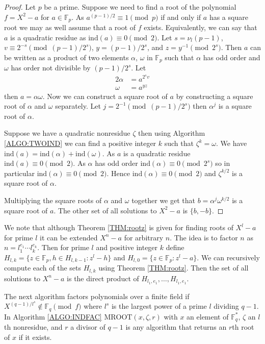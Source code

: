 \documentclass{article}
\theoremstyle{plain}
\theoremstyle{definition}
\def\Fp {{ \mathbb{F} _ {p} }}
\def\Fq {{ \mathbb{F} _ {q} }}
\def\FQ {{ \mathbb{F}^* _ {q} }}
\def\ind {{ \mathrm{ind} }}
\begin{document}
    \begin{proof}
		    Let $p$ be a prime. Suppose we need to find a root of the polynomial $f=X^2-a$ for $a \in \Fp$. As $a^{(p-1)/2} \equiv 1 \pmod p$ if and only if $a$ has a square root we may as well assume that a root of $f$ exists. Equivalently, we can say that $a$ is a quadratic residue as $\ind(a) \equiv 0 \pmod 2$. Let $s=\nu_l(p-1)$, $v \equiv 2^{-s} \pmod {(p-1)/2^s}$, $y={(p-1)/2^s}$, and $ z=y^{-1} \pmod {2^s}$. Then $a$ can be written as a product of two elements $\alpha$, $\omega$ in $\Fp$ such that $\alpha$ has odd order and $\omega$ has order not divisible by ${(p-1)/2^s}$. Let
				\begin{alignat*}{2}
				    \alpha &= a^{2^s v} \\
				    \omega &= a^{y z} 
				\end{alignat*}
				then $a=\alpha \omega$. Now we can construct a square root of $a$ by constructing a square root of $\alpha$ and $\omega$ separately. Let $j=2^{-1} \pmod {(p-1)/2^s}$ then $\alpha^j$ is a square root of $\alpha$. 
				
				Suppose we have a quadratic nonresidue $\zeta$ then using Algorithm \ref{ALGO:TWOIND} we can find a positive integer $k$ such that $\zeta^k=\omega$. We have $\ind(a)=\ind(\alpha)+\ind(\omega)$. As $a$ is a quadratic residue $\ind(a) \equiv 0 \pmod 2$. As $\alpha$ has odd order $\ind(\alpha) \equiv 0 \pmod 2^s$ so in particular $\ind(\alpha) \equiv 0 \pmod 2$. Hence $\ind(\alpha) \equiv 0 \pmod 2$ and $\zeta^{k/2}$ is a square root of $\alpha$. 
				
				Multiplying the square roots of $\alpha$ and $\omega$ together we get that $b=\alpha^j\omega^{k/2}$ is a square root of $a$. The other set of all solutions to $X^2-a$ is $\{b,-b \}$.
				
		\end{proof}
		
		We note that although Theorem \ref{THM:rootz} is given for finding roots of $X^l-a$ for prime $l$ it can be extended $X^n-a$ for arbitrary $n$. The idea is to factor $n$ as $n=l_1^{e_1} \cdots l_k^{e_k}$. Then for prime $l$ and positive integer $k$ define $H_{l,k}=\{z \in \Fp, h \in H_{l,k-1} : z^l-h \}$ and $H_{l,0}=\{z \in \Fp : z^l-a \}$. We can recursively compute each of the sets $H_{l,k}$ using Theorem \ref{THM:rootz}. Then the set of all solutions to $X^n-a$ is the direct product of $H_{l_1,e_1},\ldots,H_{l_1,e_1}$. 
								
		The next algorithm factors polynomials over a finite field if $X^{(q-1)/{l^s}} \not\in \Fq \pmod f$ where $l^s$ is the largest power of a prime $l$ dividing $q-1$. In Algorithm \ref{ALGO:INDFAC} $\textrm{MROOT}(x,\zeta,r)$ with $x$ an element of $\FQ$, $\zeta$ an $l$th nonresidue, and $r$ a divisor of $q-1$ is any algorithm that returns an $r$th root of $x$ if it exists. 
				
\end{document}
